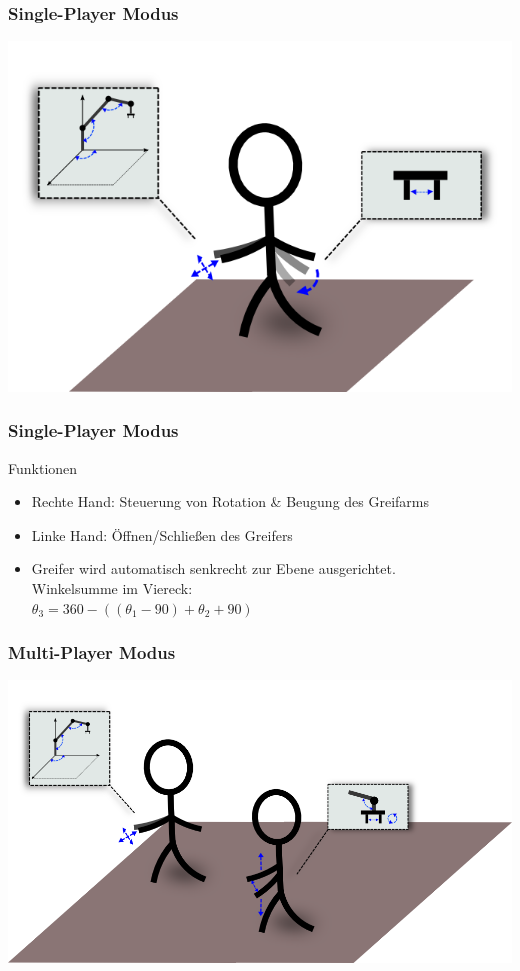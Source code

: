 \begin{frame}
\frametitle{Single-Player Modus}
\begin{center}
\includegraphics[scale=0.45]{imgs/singleplayer.png}
\end{center}
\end{frame}

\begin{frame}
\frametitle{Single-Player Modus}
\begin{block}{Funktionen}
\begin{itemize}
\item Rechte Hand: Steuerung von Rotation \& Beugung des Greifarms
\item Linke Hand: Öffnen/Schließen des Greifers
\item Greifer wird automatisch senkrecht zur Ebene ausgerichtet. \\
Winkelsumme im Viereck: \\ $\theta_3 = 360-((\theta_1-90)+\theta_2+90)$
\end{itemize}
\end{block}

\end{frame}


\begin{frame}
\frametitle{Multi-Player Modus}
\begin{center}
\includegraphics[scale=0.4]{imgs/multiplayer.png}
\end{center}
\end{frame}


